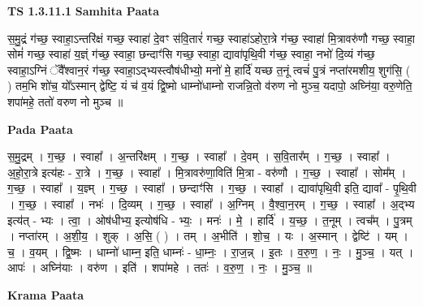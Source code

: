 \documentclass[17pt]{extarticle}
\begin{document}
\textbf{TS 1.3.11.1 } \newline
\textbf{Samhita Paata} \newline

स॒मु॒द्रं ग॑च्छ॒ स्वाहा॒ऽन्तरि॑क्षं गच्छ॒ स्वाहा॑ दे॒वꣳ स॑वि॒तारं॑ गच्छ॒ स्वाहा॑ऽहोरा॒त्रे ग॑च्छ॒ स्वाहा॑ मि॒त्रावरु॑णौ गच्छ॒ स्वाहा॒ सोमं॑ गच्छ॒ स्वाहा॑ य॒ज्ञ्ं ग॑च्छ॒ स्वाहा॒ छन्दाꣳ॑सि गच्छ॒ स्वाहा॒ द्यावा॑पृथि॒वी ग॑च्छ॒ स्वाहा॒ नभो॑ दि॒व्यं ग॑च्छ॒ स्वाहा॒ऽग्निं ॅवै᳚श्वान॒रं ग॑च्छ॒ स्वाहा॒ऽद्भ्यस्त्वौष॑धीभ्यो॒ मनो॑ मे॒ हार्दि॑ यच्छ त॒नूं त्वचं॑ पु॒त्रं नप्ता॑रमशीय॒ शुग॑सि॒ ( ) तम॒भि शो॑च॒ यो᳚ऽस्मान् द्वेष्टि॒ यं च॑ व॒यं द्वि॒ष्मो धाम्नो॑धाम्नो राजन्नि॒तो व॑रुण नो मुञ्च॒ यदापो॒ अघ्नि॑या॒ वरु॒णेति॒ शपा॑महे॒ ततो॑ वरुण नो मुञ्च ॥ \newline

\textbf{Pada Paata} \newline

स॒मु॒द्रम् । ग॒च्छ॒ । स्वाहा᳚ । अ॒न्तरि॑क्षम् । ग॒च्छ॒ । स्वाहा᳚ । दे॒वम् । स॒वि॒तार᳚म् । ग॒च्छ॒ । स्वाहा᳚ । अ॒हो॒रा॒त्रे इत्य॑हः - रा॒त्रे । ग॒च्छ॒ । स्वाहा᳚ । मि॒त्रावरु॑णा॒विति॑ मि॒त्रा - वरु॑णौ । ग॒च्छ॒ । स्वाहा᳚ । सोम᳚म् । ग॒च्छ॒ । स्वाहा᳚ । य॒ज्ञ्म् । ग॒च्छ॒ । स्वाहा᳚ । छन्दाꣳ॑सि । ग॒च्छ॒ । स्वाहा᳚ । द्यावा॑पृथि॒वी इति॒ द्यावा᳚ - पृ॒थि॒वी । ग॒च्छ॒ । स्वाहा᳚ । नभः॑ । दि॒व्यम् । ग॒च्छ॒ । स्वाहा᳚ । अ॒ग्निम् । वै॒श्वा॒न॒रम् । ग॒च्छ॒ । स्वाहा᳚ । अ॒द्भ्य इत्य॑त् - भ्यः । त्वा॒ । ओष॑धीभ्य॒ इत्योष॑धि - भ्यः॒ । मनः॑ । मे॒ । हार्दि॑ । य॒च्छ॒ । त॒नूम् । त्वच᳚म् । पु॒त्रम् । नप्ता॑रम् । अ॒शी॒य॒ । शुक् । अ॒सि॒ ( ) । तम् । अ॒भीति॑ । शो॒च॒ । यः । अ॒स्मान् । द्वेष्टि॑ । यम् । च॒ । व॒यम् । द्वि॒ष्मः । धाम्नो॑ धाम्न॒ इति॒ धाम्नः॑ - धा॒म्नः॒ । रा॒ज॒न्न् । इ॒तः । व॒रु॒ण॒ । नः॒ । मु॒ञ्च॒ । यत् । आपः॑ । अघ्नि॑याः । वरु॑ण । इति॑ । शपा॑महे । ततः॑ । व॒रु॒ण॒ । नः॒ । मु॒ञ्च॒ ॥  \newline


\textbf{Krama Paata} \newline
\end{document}
